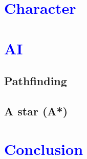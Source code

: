 \documentclass[article]{report}             %
\begin{document}
		\chapter{\textcolor{blue}{Character}}

		\chapter{\textcolor{blue}{AI}}
			\section{Pathfinding}
				
			\section{A star (A*)}

		\chapter{\textcolor{blue}{Conclusion}}
				     		
\end{document}
